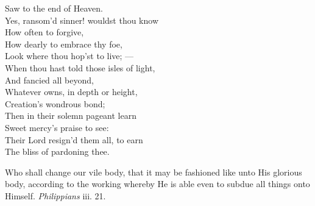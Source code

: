  Saw to the end of Heaven. \\
  Yes, ransom’d sinner! wouldst thou know \\
 How often to forgive, \\
 How dearly to embrace thy foe, \\
 Look where thou hop’st to live; — \\
  When thou hast told those isles of light, \\
 And fancied all beyond, \\
 Whatever owns, in depth or height, \\
 Creation’s wondrous bond; \\
  Then in their solemn pageant learn \\
 Sweet mercy’s praise to see: \\
 Their Lord resign’d them all, to earn \\
 The bliss of pardoning thee.\\


Who shall change our vile body, that it may be fashioned like unto His glorious body, according to the working whereby He is able even to subdue all things onto Himself. \emph{Philippians} iii. 21.

